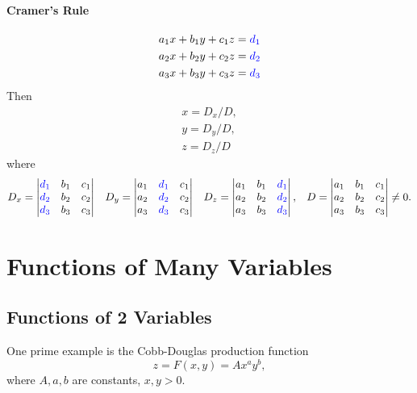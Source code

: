 \documentclass[10pt,a4paper]{book}
\newcommand{\blue}[1]{\textcolor{blue}{#1}}
\theoremstyle{definition}\newtheorem{definition}{Definition}
\theoremstyle{definition}\newtheorem{fact}{Fact}
\theoremstyle{definition}\newtheorem{ex}{Ex.}
\theoremstyle{definition}\newtheorem{project}{Project}
\theoremstyle{definition}\newtheorem{problem}{Problem}
\theoremstyle{definition}\newtheorem{example}{Example}
\numberwithin{theorem}{chapter}
\numberwithin{corollary}{chapter}
\numberwithin{assumption}{chapter}
\numberwithin{definition}{chapter}
\numberwithin{prop}{chapter}
\numberwithin{notation}{chapter}
\numberwithin{problem}{chapter}
\numberwithin{example}{chapter}
\numberwithin{fact}{chapter}
\numberwithin{ex}{chapter}
\begin{document}
	\subsubsection{Cramer's Rule}
	\begin{align*}
		a_1  x + b_1 y + c_1 z = \blue{d_1} \\
		a_2  x + b_2 y + c_2 z = \blue{d_2} \\
		a_3  x + b_3 y + c_3 z = \blue{d_3}
	\end{align*}
	Then
	\begin{align*}
		x = D_x/ D, \\
		y = D_y / D, \\
		z = D_z/ D
	\end{align*}
	where 
	\begin{align*}
		D_x = 
		\begin{vmatrix}
			\blue{d_1} & b_1 & c_1 \\
			\blue{d_2} & b_2 & c_2 \\
			\blue{d_3} & b_3 & c_3
		\end{vmatrix} &&
		D_y = 
		\begin{vmatrix}
			a_1 & \blue{d_1} & c_1 \\
			a_2 & \blue{d_2} & c_2 \\
			a_3 & \blue{d_3} & c_3
		\end{vmatrix}	&&
		D_z = \begin{vmatrix}
			a_1 & b_1 & \blue{d_1} \\
			a_2 & b_2 & \blue{d_2} \\
			a_3 & b_3 & \blue{d_3} 
		\end{vmatrix}, &&
		D = \begin{vmatrix}
			a_1 & b_1 & c_1 \\
			a_2 & b_2 & c_2 \\
			a_3 & b_3 & c_3
		\end{vmatrix} \neq 0.
	\end{align*}
	
	\chapter{Functions of Many Variables}
	\section{Functions of 2 Variables}
	One prime example is the Cobb-Douglas production function
	\begin{equation}
		z = F(x,y) = A x^a y^b, \label{eq:cobbdouglas}
	\end{equation}
	where $A, a, b$ are constants, $x,y > 0$.
	
\end{document}
